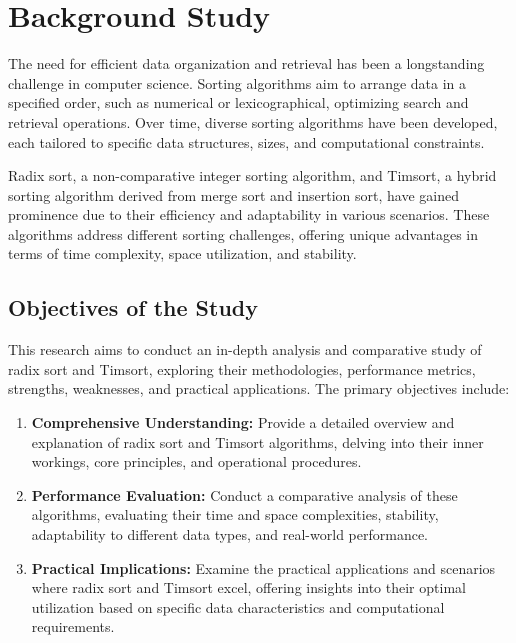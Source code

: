 \documentclass[conference]{IEEEtran}
\begin{document}
\section{Background Study}
The need for efficient data organization and retrieval has been a longstanding challenge in computer science. Sorting algorithms aim to arrange data in a specified order, such as numerical or lexicographical, optimizing search and retrieval operations. Over time, diverse sorting algorithms have been developed, each tailored to specific data structures, sizes, and computational constraints.

Radix sort, a non-comparative integer sorting algorithm, and Timsort, a hybrid sorting algorithm derived from merge sort and insertion sort, have gained prominence due to their efficiency and adaptability in various scenarios. These algorithms address different sorting challenges, offering unique advantages in terms of time complexity, space utilization, and stability.
\subsection{Objectives of the Study}\cite{3}
This research aims to conduct an in-depth analysis and comparative study of radix sort and Timsort, exploring their methodologies, performance metrics, strengths, weaknesses, and practical applications. The primary objectives include:
\begin{enumerate}
	\item \textbf{Comprehensive Understanding:} Provide a detailed overview and explanation of radix sort and Timsort algorithms, delving into their inner workings, core principles, and operational procedures.
	\item \textbf{Performance Evaluation:} Conduct a comparative analysis of these algorithms, evaluating their time and space complexities, stability, adaptability to different data types, and real-world performance.
	\item \textbf{Practical Implications:} Examine the practical applications and scenarios where radix sort and Timsort excel, offering insights into their optimal utilization based on specific data characteristics and computational requirements.
\end{enumerate}
\end{document}
